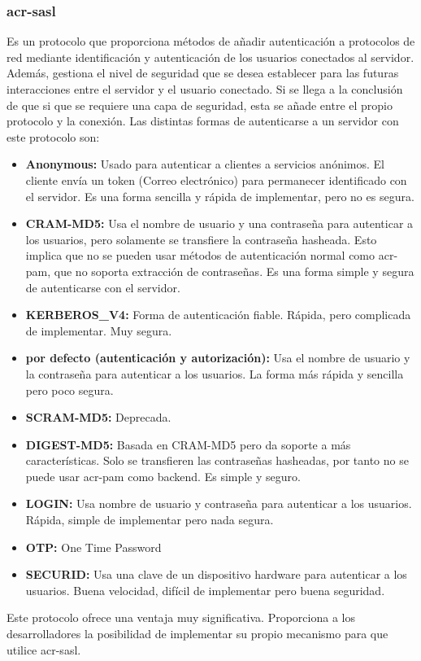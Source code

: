 \documentclass[titlepage, 12pt, a4paper]{article}
\begin{document}
\subsubsection{\gls{acr-sasl}}
Es un protocolo que proporciona métodos de añadir autenticación a protocolos de red mediante identificación y autenticación de los usuarios conectados al servidor. Además, gestiona el nivel de seguridad que se desea establecer para las futuras interacciones entre el servidor y el usuario conectado. Si se llega a la conclusión de que si que se requiere una capa de seguridad, esta se añade entre el propio protocolo y la conexión.\cite{rfc2222} 
Las distintas formas de autenticarse a un servidor con este protocolo son:
\begin{itemize}
	\item{\textbf{Anonymous: }}Usado para autenticar a clientes a servicios anónimos. El cliente envía un token (Correo electrónico) para permanecer identificado con el servidor. Es una forma sencilla y rápida de implementar, pero no es segura.
	\item{\textbf{CRAM-MD5: }}Usa el nombre de usuario y una contraseña para autenticar a los usuarios, pero solamente se transfiere la contraseña hasheada. Esto implica que no se pueden usar métodos de autenticación normal como \gls{acr-pam}, que no soporta extracción de contraseñas. Es una forma simple y segura de autenticarse con el servidor.
	\item{\textbf{KERBEROS\_V4: }}Forma de autenticación fiable. Rápida, pero complicada de implementar. Muy segura.
	\item{\textbf{por defecto (autenticación y autorización): }}Usa el nombre de usuario y la contraseña para autenticar a los usuarios. La forma más rápida y sencilla pero poco segura.
	\item{\textbf{SCRAM-MD5: }}Deprecada.
	\item{\textbf{DIGEST-MD5: }}Basada en CRAM-MD5 pero da soporte a más características. Solo se transfieren las contraseñas hasheadas, por tanto no se puede usar \gls{acr-pam} como backend. Es simple y seguro.
	\item{\textbf{LOGIN: }}Usa nombre de usuario y contraseña para autenticar a los usuarios. Rápida, simple de implementar pero nada segura.
	\item{\textbf{OTP: }}One Time Password
	\item{\textbf{SECURID: }}Usa una clave de un dispositivo hardware para autenticar a los usuarios. Buena velocidad, difícil de implementar pero buena seguridad.
\end{itemize}
Este protocolo ofrece una ventaja muy significativa. Proporciona a los desarrolladores la posibilidad de implementar su propio mecanismo para que utilice \gls{acr-sasl}.
\end{document}
